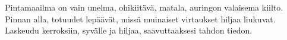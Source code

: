 \documentclass{article}
\begin{document}
\begin{infobox}
Pintamaailma on vain unelma, ohikiitävä, matala, auringon valaisema kiilto.\\
Pinnan alla, totuudet lepäävät, missä muinaiset virtaukset hiljaa liukuvat.\\
Laskeudu kerroksiin, syvälle ja hiljaa, saavuttaaksesi tahdon tiedon.
\end{infobox}
\end{document}
